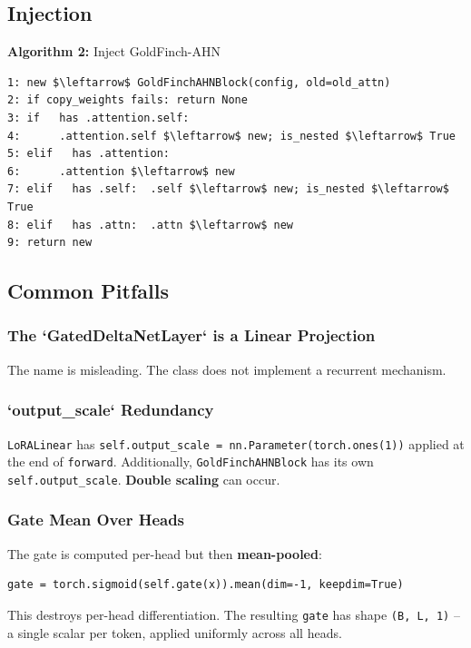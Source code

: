 \subsection{Injection}

\textbf{Algorithm 2:} Inject GoldFinch-AHN
\begin{lstlisting}
1: new $\leftarrow$ GoldFinchAHNBlock(config, old=old_attn)
2: if copy_weights fails: return None
3: if   has .attention.self:
4:      .attention.self $\leftarrow$ new; is_nested $\leftarrow$ True
5: elif   has .attention:
6:      .attention $\leftarrow$ new
7: elif   has .self:  .self $\leftarrow$ new; is_nested $\leftarrow$ True
8: elif   has .attn:  .attn $\leftarrow$ new
9: return new
\end{lstlisting}

\subsection{Common Pitfalls}

\subsubsection{The `GatedDeltaNetLayer` is a Linear Projection}

The name is misleading. The class does not implement a recurrent mechanism.

\subsubsection{`output\_scale` Redundancy}

\texttt{LoRALinear} has \texttt{self.output\_scale = nn.Parameter(torch.ones(1))} applied 
at the end of \texttt{forward}. Additionally, \texttt{GoldFinchAHNBlock} has its own 
\texttt{self.output\_scale}. \textbf{Double scaling} can occur.

\subsubsection{Gate Mean Over Heads}

The gate is computed per-head but then \textbf{mean-pooled}:

\begin{lstlisting}
gate = torch.sigmoid(self.gate(x)).mean(dim=-1, keepdim=True)
\end{lstlisting}

This destroys per-head differentiation. The resulting \texttt{gate} has shape 
\texttt{(B, L, 1)} -- a single scalar per token, applied uniformly across all heads.

